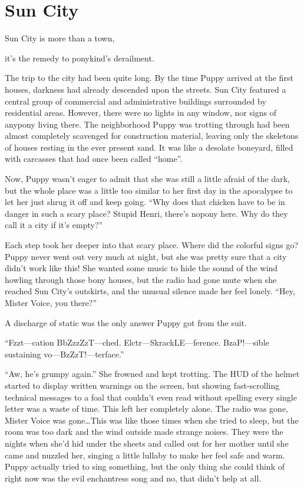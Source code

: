 
\chapter{Sun City}


\begin{intro}
Sun City is more than a town, 

it's the remedy to ponykind's derailment.
\end{intro}



The trip to the city had been quite long. By the time Puppy arrived at the first houses, darkness had already descended upon the streets. Sun City featured a central group of commercial and administrative buildings surrounded by residential areas. However, there were no lights in any window, nor signs of anypony living there. The neighborhood Puppy was trotting through had been almost completely scavenged for construction material, leaving only the skeletons of houses resting in the ever present sand. It was like a desolate boneyard, filled with carcasses that had once been called ``home''.

Now, Puppy wasn't eager to admit that she was still a little afraid of the dark, but the whole place was a little too similar to her first day in the apocalypse to let her just shrug it off and keep going. ``Why does that chicken have to be in danger in such a scary place? Stupid Henri, there's nopony here. Why do they call it a city if it's empty?''

Each step took her deeper into that scary place. Where did the colorful signs go? Puppy never went out very much at night, but she was pretty sure that a city didn't work like this! She wanted some music to hide the sound of the wind howling through those bony houses, but the radio had gone mute when she reached Sun City's outskirts, and the unusual silence made her feel lonely. ``Hey, Mister Voice, you there?''

A discharge of static was the only answer Puppy got from the suit.

{\mten ``Fzzt---cation BbZzzZzT---ched. Elctr---SkrackLE---ference. BzaP!---sible sustaining vo---BzZzT!---terface.''}

``Aw, he's grumpy again.'' She frowned and kept trotting. The HUD of the helmet started to display written warnings on the screen, but showing fast-scrolling technical messages to a foal that couldn't even read without spelling every single letter was a waste of time. This left her completely alone. The radio was gone, Mister Voice was gone\dots This was like those times when she tried to sleep, but the room was too dark and the wind outside made strange noises. They were the nights when she'd hid under the sheets and called out for her mother until she came and nuzzled her, singing a little lullaby to make her feel safe and warm. Puppy actually tried to sing something, but the only thing she could think of right now was the evil enchantress song and no, that didn't help at all.

